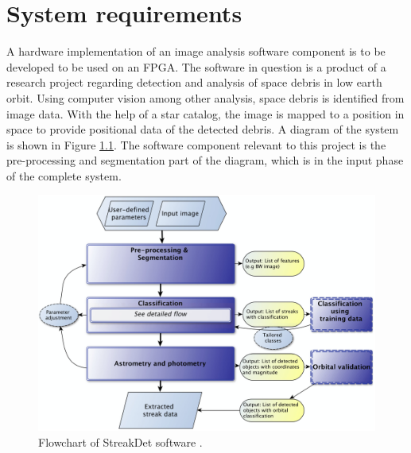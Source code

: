 \documentclass[12pt]{report}
\begin{document}

\chapter{System requirements}

A hardware implementation of an image analysis software component is to be developed to be used on an FPGA. The software in question is a product of a research project regarding detection and analysis of space debris in low earth orbit. Using computer vision among other analysis, space debris is identified from image data. With the help of a star catalog, the image is mapped to a position in space to provide positional data of the detected debris. A diagram of the system is shown in Figure \ref{fig:0}. The software component relevant to this project is the pre-processing and segmentation part of the diagram, which is in the input phase of the complete system. \citep{StreakDet} \citep{Starmatch}

\begin{figure}[h]
    \centering
    \includegraphics[scale=0.2]{figures/streakdet.png}
    \caption{Flowchart of StreakDet software \citep{StreakDet}.}
    \label{fig:0}
\end{figure}
\end{document}

